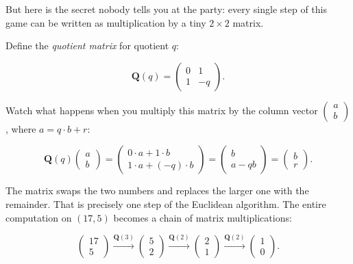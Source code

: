 \documentclass[11pt,openright,twoside]{book}
\theoremstyle{definition}
\begin{document}
But here is the secret nobody tells you at the party: every single step of this game can be written as multiplication by a tiny $2 \times 2$ matrix.

Define the \textit{quotient matrix} for quotient $q$:

\[
\mathbf{Q}(q) = \begin{pmatrix} 0 & 1 \\ 1 & -q \end{pmatrix}.
\]

Watch what happens when you multiply this matrix by the column vector $\begin{pmatrix} a \\ b \end{pmatrix}$, where $a = q \cdot b + r$:

\[
\mathbf{Q}(q) \begin{pmatrix} a \\ b \end{pmatrix} = \begin{pmatrix} 0 \cdot a + 1 \cdot b \\ 1 \cdot a + (-q) \cdot b \end{pmatrix} = \begin{pmatrix} b \\ a - qb \end{pmatrix} = \begin{pmatrix} b \\ r \end{pmatrix}.
\]

The matrix swaps the two numbers and replaces the larger one with the remainder. That is precisely one step of the Euclidean algorithm. The entire computation on $(17, 5)$ becomes a chain of matrix multiplications:

\[
\begin{pmatrix} 17 \\ 5 \end{pmatrix} \xrightarrow{\mathbf{Q}(3)} \begin{pmatrix} 5 \\ 2 \end{pmatrix} \xrightarrow{\mathbf{Q}(2)} \begin{pmatrix} 2 \\ 1 \end{pmatrix} \xrightarrow{\mathbf{Q}(2)} \begin{pmatrix} 1 \\ 0 \end{pmatrix}.
\]
\end{document}
